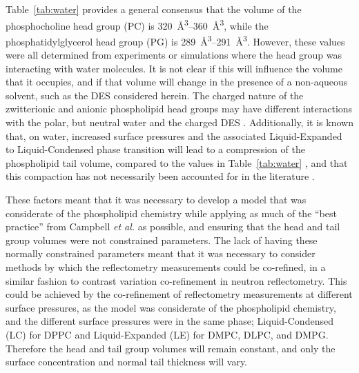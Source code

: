 Table~\ref{tab:water} provides a general consensus that the volume of the phosphocholine head group (PC) is \SIrange{320}{360}{\angstrom\cubed}, while the phosphatidylglycerol head group (PG) is \SIrange{289}{291}{\angstrom\cubed}.
However, these values were all determined from experiments or simulations where the head group was interacting with water molecules.
It is not clear if this will influence the volume that it occupies, and if that volume will change in the presence of a non-aqueous solvent, such as the DES considered herein.
The charged nature of the zwitterionic and anionic phospholipid head groups may have different interactions with the polar, but neutral water and the charged DES \cite{sanchez-fernandez_self-assembly_2018}.
Additionally, it is known that, on water, increased surface pressures and the associated Liquid-Expanded to Liquid-Condensed phase transition will lead to a compression of the phospholipid tail volume, compared to the values in Table~\ref{tab:water} \cite{marsh_molecular_2010,small_lateral_1984}, and that this compaction has not necessarily been accounted for in the literature \cite{campbell_structure_2018}.

These factors meant that it was necessary to develop a model that was considerate of the phospholipid chemistry while applying as much of the ``best practice'' from Campbell \emph{et al.} \cite{campbell_structure_2018} as possible, and ensuring that the head and tail group volumes were not constrained parameters.
The lack of having these normally constrained parameters meant that it was necessary to consider methods by which the reflectometry measurements could be co-refined, in a similar fashion to contrast variation co-refinement in neutron reflectometry.
This could be achieved by the co-refinement of reflectometry measurements at different surface pressures, as the model was considerate of the phospholipid chemistry, and the different surface pressures were in the same phase; Liquid-Condensed (LC) for DPPC and Liquid-Expanded (LE) for DMPC, DLPC, and DMPG.
Therefore the head and tail group volumes will remain constant, and only the surface concentration and normal tail thickness will vary.

